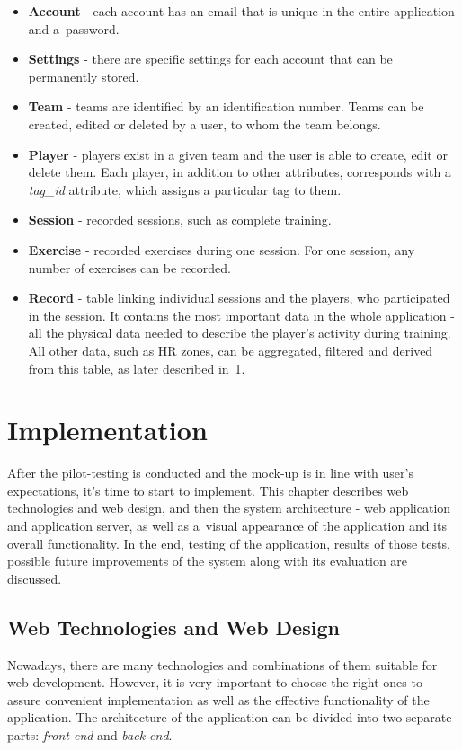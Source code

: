\begin{itemize}
\item \textbf{Account} - each account has an email that is unique in the entire application and a~password.
\item \textbf{Settings} - there are specific settings for each account that can be permanently stored.
\item \textbf{Team} - teams are identified by an identification number. Teams can be created, edited or deleted by a user, to whom the team belongs.
\item \textbf{Player} - players exist in a given team and the user is able to create, edit or delete them. Each player, in addition to other attributes, corresponds with a \textit{tag\_id} \-attribute, which assigns a particular tag to them.
\item \textbf{Session} - recorded sessions, such as complete training.
\item \textbf{Exercise} - recorded exercises during one session. For one session, any number of exercises can be recorded.
\item \textbf{Record} - table linking individual sessions and the players, who participated in the session. It contains the most important data in the whole application - all the physical data needed to describe the player’s activity during training. All other data, such as HR zones, can be aggregated, filtered and derived from this table, as later described in~\ref{implementation}.
\end{itemize}



\chapter{Implementation}\label{implementation}
After the pilot-testing is conducted and the mock-up is in line with user’s expectations, it’s time to start to implement. This chapter describes web technologies and web design, and then the system architecture - web application and application server, as well as a~visual appearance of the application and its overall functionality. In the end, testing of the application, results of those tests, possible future improvements of the system along with its evaluation are discussed.

\section{Web Technologies and Web Design}
Nowadays, there are many technologies and combinations of them suitable for web development. However, it is very important to choose the right ones to assure convenient implementation as well as the effective functionality of the application. The architecture of the application can be divided into two separate parts: \textit{front-end} and \textit{back-end}.

